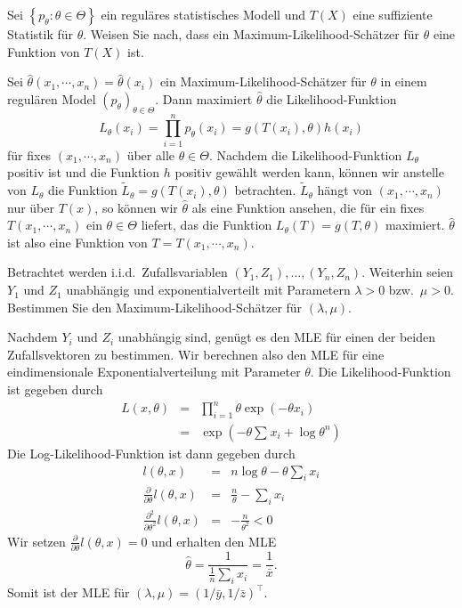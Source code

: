 Sei $\left\{ p_\theta : \theta\in\Theta \right\}$ ein reguläres statistisches
Modell und $T\left( X \right)$ eine suffiziente Statistik für $\theta$. 
Weisen Sie nach, dass ein Maximum-Likelihood-Schätzer für $\theta$ 
eine Funktion von $T\left( X \right)$ ist.

\solution Sei $\hat\theta(x_1, \cdots, x_n)=\hat \theta(x_i)$ ein 
Maximum-Likelihood-Schätzer für $\theta$ in einem regulären Model $\left( p_\theta \right)_{\theta\in\Theta}$. Dann maximiert $\hat\theta$ die Likelihood-Funktion
\begin{equation*}
    L_\theta(x_i) = \prod_{i=1}^{n} p_{\theta}(x_i) = g\left( T(x_i), \theta \right) h(x_i)
\end{equation*}
für fixes $(x_1, \cdots, x_n)$ über alle $\theta\in\Theta$. Nachdem die
Likelihood-Funktion $L_\theta$ positiv ist und die Funktion $h$ positiv gewählt
werden kann, können wir anstelle von $L_\theta$ die Funktion $\tilde L_\theta =
g(T(x_i), \theta)$ betrachten. $\tilde L_\theta$ hängt von $(x_1,\cdots,x_n)$
nur über $T(x)$, so können wir $\hat\theta$ als eine Funktion ansehen, die
für ein fixes $T(x_1, \cdots, x_n)$ ein $\theta\in\Theta$ liefert, das die
Funktion $L_\theta(T)=g(T,\theta)$ maximiert. $\hat \theta$ ist also eine
Funktion von $T=T(x_1,\cdots,x_n)$.




 Betrachtet werden 
i.i.d.\ Zufallsvariablen $(Y_1, Z_1), \ldots,(Y_n,Z_n)$. Weiterhin seien
$Y_1$ und $Z_1$ unabhängig und exponentialverteilt mit Parametern
$\lambda > 0$ bzw.\ $\mu > 0$. Bestimmen Sie den Maximum-Likelihood-Schätzer
für $(\lambda,\mu)$.

\solution    Nachdem $Y_i$ und $Z_i$ unabhängig sind, genügt es den 
MLE für einen der beiden Zufallsvektoren zu bestimmen. Wir berechnen also den MLE für eine
eindimensionale Exponentialverteilung mit Parameter $\theta$.
Die Likelihood-Funktion ist gegeben durch
\begin{eqnarray}
	L(x, \theta) &=&  \prod_{i=1}^n \theta \exp\left(  -\theta x_i \right) \\
	&=&  \exp \left(  -\theta \sum_{}^{} x_i + \log \theta^n \right)
\end{eqnarray}
Die Log-Likelihood-Funktion ist dann gegeben durch
\begin{eqnarray}
	l(\theta, x) &=& n \log \theta - \theta \sum_{i}^{} x_i \\
	\frac{\partial}{\partial \theta} l(\theta,x) &=&  \frac{n}{\theta } - \sum_{i}^{} x_i \\
	\frac{\partial^2}{\partial \theta^2} l(\theta,x) &=& - \frac{n}{\theta^2} < 0
\end{eqnarray}
Wir setzen $\frac{\partial}{\partial \theta} l(\theta,x) = 0$ und erhalten den MLE
\begin{equation}
	\hat \theta = \frac{1}{\frac{1}{n} \sum_{i}^{} x_i} = \frac{1}{\bar x}.
\end{equation}
Somit ist der MLE für $\left( \lambda, \mu \right) = \left( 1/\bar y, 1/\bar z \right)^\top$.


